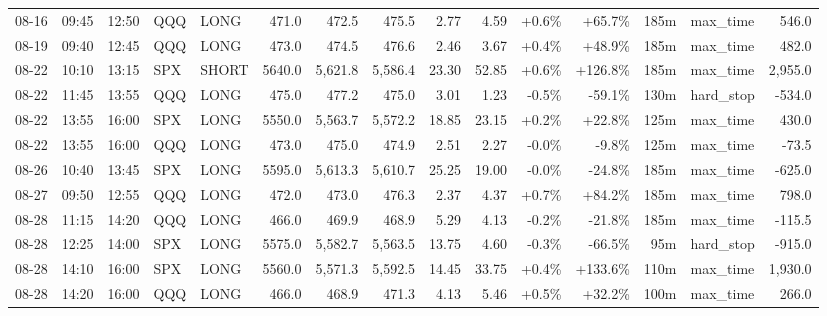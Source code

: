 \documentclass[11pt,a4paper,twoside]{article}
\begin{document}
\begin{landscape}
\begin{center}
\begin{longtable}{>{\color{txtmain}}l l l l l r r r r r r r r >{\color{txtmain}}l r}
08-16 & 09:45 & 12:50 & QQQ & LONG & 471.0 & 472.5 & 475.5 & 2.77 & 4.59 & \textcolor{wingreen}{+0.6\%} & \textcolor{wingreen}{+65.7\%} & 185m & max\_time & \textcolor{wingreen}{546.0} \\
08-19 & 09:40 & 12:45 & QQQ & LONG & 473.0 & 474.5 & 476.6 & 2.46 & 3.67 & \textcolor{wingreen}{+0.4\%} & \textcolor{wingreen}{+48.9\%} & 185m & max\_time & \textcolor{wingreen}{482.0} \\
08-22 & 10:10 & 13:15 & SPX & SHORT & 5640.0 & 5,621.8 & 5,586.4 & 23.30 & 52.85 & \textcolor{wingreen}{+0.6\%} & \textcolor{wingreen}{+126.8\%} & 185m & max\_time & \textcolor{wingreen}{2,955.0} \\
08-22 & 11:45 & 13:55 & QQQ & LONG & 475.0 & 477.2 & 475.0 & 3.01 & 1.23 & \textcolor{lossred}{-0.5\%} & \textcolor{lossred}{-59.1\%} & 130m & hard\_stop & \textcolor{lossred}{-534.0} \\
08-22 & 13:55 & 16:00 & SPX & LONG & 5550.0 & 5,563.7 & 5,572.2 & 18.85 & 23.15 & \textcolor{wingreen}{+0.2\%} & \textcolor{wingreen}{+22.8\%} & 125m & max\_time & \textcolor{wingreen}{430.0} \\
08-22 & 13:55 & 16:00 & QQQ & LONG & 473.0 & 475.0 & 474.9 & 2.51 & 2.27 & \textcolor{lossred}{-0.0\%} & \textcolor{lossred}{-9.8\%} & 125m & max\_time & \textcolor{lossred}{-73.5} \\
08-26 & 10:40 & 13:45 & SPX & LONG & 5595.0 & 5,613.3 & 5,610.7 & 25.25 & 19.00 & \textcolor{lossred}{-0.0\%} & \textcolor{lossred}{-24.8\%} & 185m & max\_time & \textcolor{lossred}{-625.0} \\
08-27 & 09:50 & 12:55 & QQQ & LONG & 472.0 & 473.0 & 476.3 & 2.37 & 4.37 & \textcolor{wingreen}{+0.7\%} & \textcolor{wingreen}{+84.2\%} & 185m & max\_time & \textcolor{wingreen}{798.0} \\
08-28 & 11:15 & 14:20 & QQQ & LONG & 466.0 & 469.9 & 468.9 & 5.29 & 4.13 & \textcolor{lossred}{-0.2\%} & \textcolor{lossred}{-21.8\%} & 185m & max\_time & \textcolor{lossred}{-115.5} \\
08-28 & 12:25 & 14:00 & SPX & LONG & 5575.0 & 5,582.7 & 5,563.5 & 13.75 & 4.60 & \textcolor{lossred}{-0.3\%} & \textcolor{lossred}{-66.5\%} & 95m & hard\_stop & \textcolor{lossred}{-915.0} \\
08-28 & 14:10 & 16:00 & SPX & LONG & 5560.0 & 5,571.3 & 5,592.5 & 14.45 & 33.75 & \textcolor{wingreen}{+0.4\%} & \textcolor{wingreen}{+133.6\%} & 110m & max\_time & \textcolor{wingreen}{1,930.0} \\
08-28 & 14:20 & 16:00 & QQQ & LONG & 466.0 & 468.9 & 471.3 & 4.13 & 5.46 & \textcolor{wingreen}{+0.5\%} & \textcolor{wingreen}{+32.2\%} & 100m & max\_time & \textcolor{wingreen}{266.0} \\

\end{longtable}
\end{center}
\end{landscape}
\end{document}
